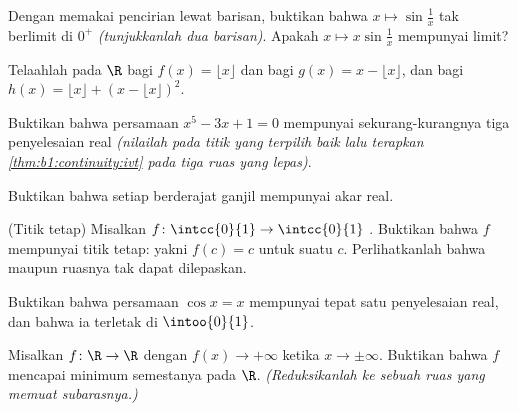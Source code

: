 \begin{exercise}[$\star$]\label{exo:b1:continuity:1}
Dengan memakai pencirian lewat barisan, buktikan bahwa $x \mapsto
\sin\frac 1x$ tak berlimit di $0^+$ \emph{(tunjukkanlah dua barisan)}.
Apakah $x \mapsto x \sin\frac 1x$ mempunyai limit?
\end{exercise}

\begin{exercise}[$\star$]\label{exo:b1:continuity:2}
Telaahlah  pada $\R$ bagi $f(x) = \lfloor x \rfloor$ dan bagi
$g(x) = x - \lfloor x \rfloor$, dan bagi $h(x) = \lfloor x \rfloor +
(x - \lfloor x\rfloor)^2$.
\end{exercise}

\begin{exercise}[$\star$]\label{exo:b1:continuity:3}
Buktikan bahwa persamaan $x^5 - 3x + 1 = 0$ mempunyai sekurang-kurangnya tiga penyelesaian
real \emph{(nilailah pada titik yang terpilih baik lalu terapkan
\cref{thm:b1:continuity:ivt} pada tiga ruas yang lepas)}.
\end{exercise}

\begin{exercise}[$\star$]\label{exo:b1:continuity:4}
Buktikan bahwa setiap  berderajat ganjil mempunyai akar real.
\end{exercise}

\begin{exercise}[$\star\star$]\label{exo:b1:continuity:5}
(Titik tetap) Misalkan $f \colon \intcc{0}{1} \to \intcc{0}{1}$
. Buktikan bahwa $f$ mempunyai titik tetap: yakni $f(c) = c$ untuk suatu
$c$. Perlihatkanlah bahwa  maupun ruasnya tak dapat
dilepaskan.
\end{exercise}

\begin{exercise}[$\star\star$]\label{exo:b1:continuity:6}
Buktikan bahwa persamaan $\cos x = x$ mempunyai tepat satu penyelesaian real,
dan bahwa ia terletak di $\intoo{0}{1}$.
\end{exercise}

\begin{exercise}[$\star\star$]\label{exo:b1:continuity:7}
Misalkan $f \colon \R \to \R$  dengan $f(x) \to +\infty$ ketika $x
\to \pm\infty$. Buktikan bahwa $f$ mencapai minimum semestanya pada $\R$.
\emph{(Reduksikanlah ke sebuah ruas yang memuat  subarasnya.)}
\end{exercise}

